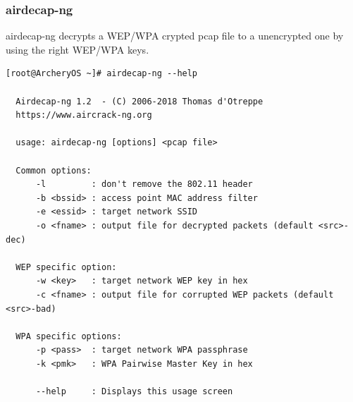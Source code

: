 \documentclass{article}
\begin{document}
\subsubsection{airdecap-ng}
airdecap-ng  decrypts  a WEP/WPA crypted pcap file to a unencrypted one by using the right WEP/WPA keys.
\begin{lstlisting}
[root@ArcheryOS ~]# airdecap-ng --help

  Airdecap-ng 1.2  - (C) 2006-2018 Thomas d'Otreppe
  https://www.aircrack-ng.org

  usage: airdecap-ng [options] <pcap file>

  Common options:
      -l         : don't remove the 802.11 header
      -b <bssid> : access point MAC address filter
      -e <essid> : target network SSID
      -o <fname> : output file for decrypted packets (default <src>-dec)

  WEP specific option:
      -w <key>   : target network WEP key in hex
      -c <fname> : output file for corrupted WEP packets (default <src>-bad)

  WPA specific options:
      -p <pass>  : target network WPA passphrase
      -k <pmk>   : WPA Pairwise Master Key in hex

      --help     : Displays this usage screen
\end{lstlisting}
\end{document}
